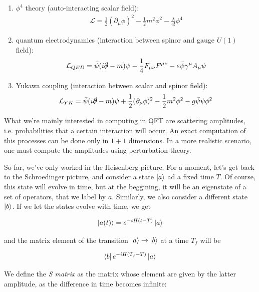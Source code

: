 \documentclass{report}
\begin{document}
\begin{enumerate}
    \item \(\phi^4\) theory (auto-interacting scalar field): 
    \begin{align}
        \mathcal{L} = \frac{1}{2}(\partial_\mu \phi)^2 - \frac{1}{2}m^2\phi^2 - \frac{\lambda}{4!}\phi^4
    \end{align}
    \item quantum electrodynamics (interaction between spinor and gauge \(U(1)\) field): 
    \begin{align}
        \mathcal{L}_{QED} = \bar{\psi}(i\slashed{\partial}-m)\psi - \frac{1}{4}F_{\mu\nu}F^{\mu\nu} - e\bar{\psi}\gamma^\mu A_\mu \psi 
    \end{align}
    \item Yukawa coupling (interaction between scalar and spinor field): 
    \begin{align}
        \mathcal{L}_{YK} = \bar{\psi}(i\slashed{\partial}-m)\psi + \frac{1}{2}(\partial_\mu \phi)^2 - \frac{1}{2}m^2 \phi^2 -g\bar{\psi}\psi \phi^2
    \end{align}
\end{enumerate}


What we're mainly interested in computing in QFT are scattering amplitudes, i.e. probabilities that a certain interaction will occur. An exact computation of this processes can be done only in \(1+1\) dimensions. In a more realistic scenario, one must compute the amplitudes using perturbation theory. 

So far, we've only worked in the Heisenberg picture. For a moment, let's get back to the Schroedinger picture, and consider a state \(\ket{a}\) ad a fixed time \(T\). Of course, this state will evolve in time, but at the beggining, it will be an eigenstate of a set of operators, that we label by \(a\). Similarly, we also consider a different state \(\ket{b}\). If we let the states evolve with time, we get 

\begin{align}
    \ket{a(t)} = e^{-iH (t-T)}\ket{a}
\end{align}

and the matrix element of the transition \(\ket{a} \rightarrow \ket{b}\) at a time \(T_f\) will be 

\begin{align}
    \bra{b}e^{-iH(T_f-T)}\ket{a}
\end{align}

We define the \emph{S matrix} as the matrix whose element are given by the latter amplitude, as the difference in time becomes infinite: 
\end{document}

